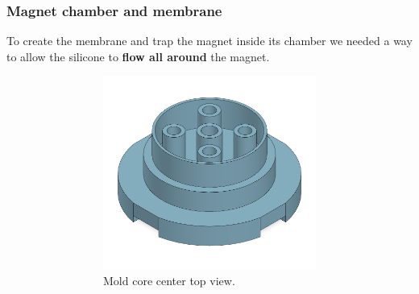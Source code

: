 \subsubsection{Magnet chamber and membrane}
To create the membrane and trap the magnet inside its chamber we needed a way to allow the silicone to \textbf{flow all around} the magnet.
\begin{figure}[H]
    \centering
    \begin{subfigure}[b]{0.8\linewidth}
        \begin{subfigure}[b]{0.475\textwidth}
            \centering
            \includegraphics[width=\linewidth]{Chapters/Chapter5/Flexible_Mat_Prototypes/Figures/mat_mold_core_center_top.PNG}
            \caption{Mold core center top view.}
            \label{fig: mat_mold_core_center_top}
        \end{subfigure}
        \hfill
        \begin{subfigure}[b]{0.475\textwidth}
            \centering

\end{subfigure}
\end{subfigure}
\end{figure}
